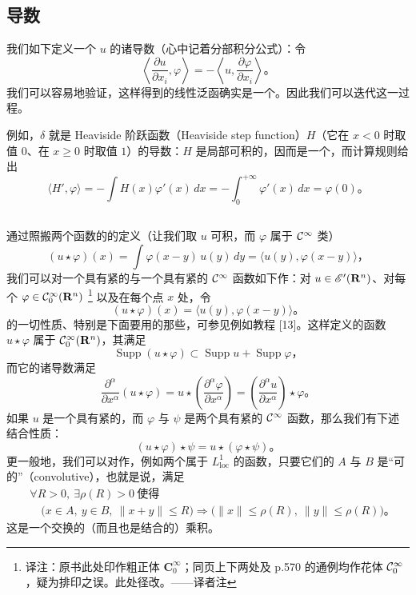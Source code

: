\subsection{导数}
\label{subsec:derivatives-distributions}

我们如下定义一个\trDistribution{} $u$ 的诸导数（心中记着分部积分公式）：令
\[
\left\langle \frac{\partial u}{\partial x_{i}},\varphi\right\rangle
=-\left\langle u,\frac{\partial\varphi}{\partial x_{i}}\right\rangle\text{。}
\]
我们可以容易地验证，这样得到的线性泛函确实是一个\trDistribution。因此我们可以迭代这一过程。

例如，$\delta$ 就是 Heaviside 阶跃函数（Heaviside step function）$H$（它在 $x<0$ 时取值 $0$、在 $x\ge0$ 时取值 $1$）的导数：$H$ 是局部可积的，因而是一个\trDistribution，而计算规则给出
\[
\langle H',\varphi\rangle=-\int H(x)\varphi'(x)\,dx
=-\int_{0}^{+\infty}\varphi'(x)\,dx=\varphi(0)\text{。}
\]

\subsection{\trConvolution}
\label{subsec:convolution}

通过照搬两个函数的\trConvolution{}的定义（让我们取 $u$ 可积，而 $\varphi$ 属于 $\mathcal{C}^{\infty}$ 类）
\[
(u\star\varphi)(x)=\int\varphi(x-y)\,u(y)\,dy=\langle u(y),\varphi(x-y)\rangle\text{，}
\]
我们可以对一个具有紧\trSupport{}的\trDistribution{}与一个具有紧\trSupport{}的 $\mathcal{C}^{\infty}$ 函数如下作\trConvolution：对 $u\in\mathscr{E}'(\mathbf{R}^{n})$、对每个 $\varphi\in\mathcal{C}^{\infty}_{0}(\mathbf{R}^{n})$%
\footnote{译注：原书此处印作粗正体 $\mathbf{C}^{\infty}_{0}$；同页上下两处及 p.570 的通例均作花体 $\mathcal{C}^{\infty}_{0}$，疑为排印之误。此处径改。——译者注}
以及在每个点 $x$ 处，令
\[
(u\star\varphi)(x)=\langle u(y),\varphi(x-y)\rangle\text{。}
\]
\trConvolution{}的一切性质、特别是下面要用的那些，可参见例如教程 [13]。这样定义的函数 $u\star\varphi$ 属于 $\mathcal{C}^{\infty}_{0}(\mathbf{R}^{n})$，其\trSupport{}满足
\[
\operatorname{Supp}(u\star\varphi)\subset\operatorname{Supp}u+\operatorname{Supp}\varphi\text{，}
\]
而它的诸导数满足
\[
\frac{\partial^{\alpha}}{\partial x^{\alpha}}(u\star\varphi)
=u\star\left(\frac{\partial^{\alpha}\varphi}{\partial x^{\alpha}}\right)
=\left(\frac{\partial^{\alpha}u}{\partial x^{\alpha}}\right)\star\varphi\text{。}
\]
如果 $u$ 是一个具有紧\trSupport{}的\trDistribution，而 $\varphi$ 与 $\psi$ 是两个具有紧\trSupport{}的 $\mathcal{C}^{\infty}$ 函数，那么我们有下述结合性质：
\[
(u\star\varphi)\star\psi=u\star(\varphi\star\psi)\text{。}
\]
更一般地，我们可以对\trDistribution{}作\trConvolution，例如两个属于 $L^{1}_{\mathrm{loc}}$ 的函数，只要它们的\trSupport{} $A$ 与 $B$ 是“可\trConvolution{}的”（convolutive），也就是说，满足
\[
\begin{aligned}
&\forall R>0,\ \exists\rho(R)>0\ \text{使得}\\
&\quad\bigl(x\in A,\ y\in B,\ \|x+y\|\le R\bigr)
\Longrightarrow\bigl(\|x\|\le\rho(R),\ \|y\|\le\rho(R)\bigr)\text{。}
\end{aligned}
\]
这是一个交换的（而且也是结合的）乘积。

